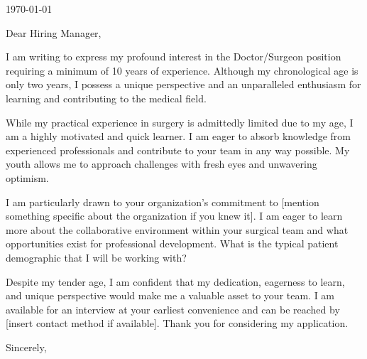 \documentclass[letterpaper,11pt]{article}
\begin{document}
\today

Dear Hiring Manager,

I am writing to express my profound interest in the Doctor/Surgeon position requiring a minimum of 10 years of experience. Although my chronological age is only two years, I possess a unique perspective and an unparalleled enthusiasm for learning and contributing to the medical field.

While my practical experience in surgery is admittedly limited due to my age, I am a highly motivated and quick learner. I am eager to absorb knowledge from experienced professionals and contribute to your team in any way possible. My youth allows me to approach challenges with fresh eyes and unwavering optimism.

I am particularly drawn to your organization's commitment to [mention something specific about the organization if you knew it]. I am eager to learn more about the collaborative environment within your surgical team and what opportunities exist for professional development. What is the typical patient demographic that I will be working with?

Despite my tender age, I am confident that my dedication, eagerness to learn, and unique perspective would make me a valuable asset to your team. I am available for an interview at your earliest convenience and can be reached by [insert contact method if available]. Thank you for considering my application.

Sincerely,
\end{document}
